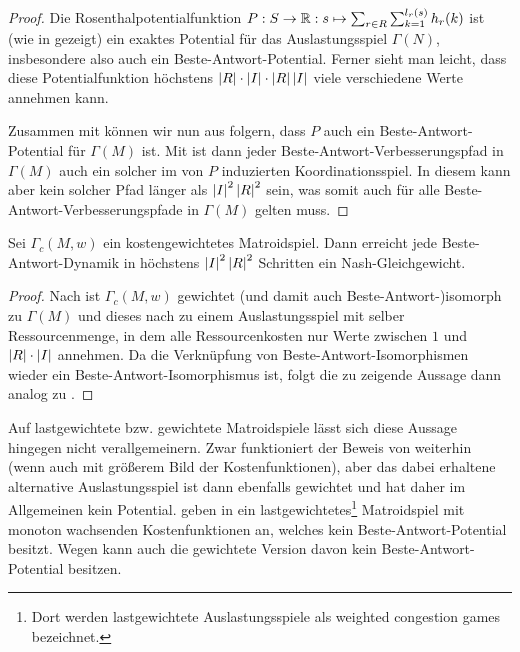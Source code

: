 \begin{proof}
	Die Rosenthalpotentialfunktion $P: S \to \mathbb{R}: s \mapsto \sum_{r \in R}\sum_{k=1}^{l_r(s)} h_r(k)$ ist (wie in  gezeigt) ein exaktes Potential für das Auslastungsspiel $\Gamma(N)$, insbesondere also auch ein Beste-Antwort-Potential. Ferner sieht man leicht, dass diese Potentialfunktion höchstens $\left|R\right|\cdot\left|I\right|\cdot \left|R\right|\left|I\right|$ viele verschiedene Werte annehmen kann.
	
	Zusammen mit  können wir nun aus  folgern, dass $P$ auch ein Beste-Antwort-Potential für $\Gamma(M)$ ist. Mit  ist dann jeder Beste-Antwort-Verbesserungspfad in $\Gamma(M)$ auch ein solcher im von $P$ induzierten Koordinationsspiel. In diesem kann aber kein solcher Pfad länger als $\left|I\right|^2\left|R\right|^2$ sein, was somit auch für alle Beste-Antwort-Verbesserungspfade in $\Gamma(M)$ gelten muss.
\end{proof}

\begin{kor}
	Sei $\Gamma_c(M,w)$ ein kostengewichtetes Matroidspiel. Dann erreicht jede Beste-Antwort-Dynamik in höchstens $\left|I\right|^2\left|R\right|^2$ Schritten ein Nash-Gleichgewicht.
\end{kor}

\begin{proof}
	Nach  ist $\Gamma_c(M,w)$ gewichtet (und damit auch Beste-Antwort-)isomorph zu $\Gamma(M)$ und dieses nach  zu einem Auslastungsspiel mit selber Ressourcenmenge, in dem alle Ressourcenkosten nur Werte zwischen $1$ und $\left|R\right|\cdot\left|I\right|$ annehmen. Da die Verknüpfung von Beste-Antwort-Isomorphismen wieder ein Beste-Antwort-Isomorphismus ist, folgt die zu zeigende Aussage dann analog zu . 
\end{proof}

Auf lastgewichtete bzw. gewichtete Matroidspiele lässt sich diese Aussage hingegen nicht verallgemeinern. Zwar funktioniert der Beweis von  weiterhin (wenn auch mit größerem Bild der Kostenfunktionen), aber das dabei erhaltene alternative Auslastungsspiel ist dann ebenfalls gewichtet und hat daher im Allgemeinen kein Potential. \citeauthor{NGinGewMatroidSpielen} geben in \cite[]{NGinGewMatroidSpielen} ein lastgewichtetes\footnote{Dort werden lastgewichtete Auslastungsspiele als \glqq weighted congestion games\grqq{} bezeichnet.} Matroidspiel mit monoton wachsenden Kostenfunktionen an, welches kein Beste-Antwort-Potential besitzt. Wegen  kann auch die gewichtete Version davon kein Beste-Antwort-Potential besitzen.

